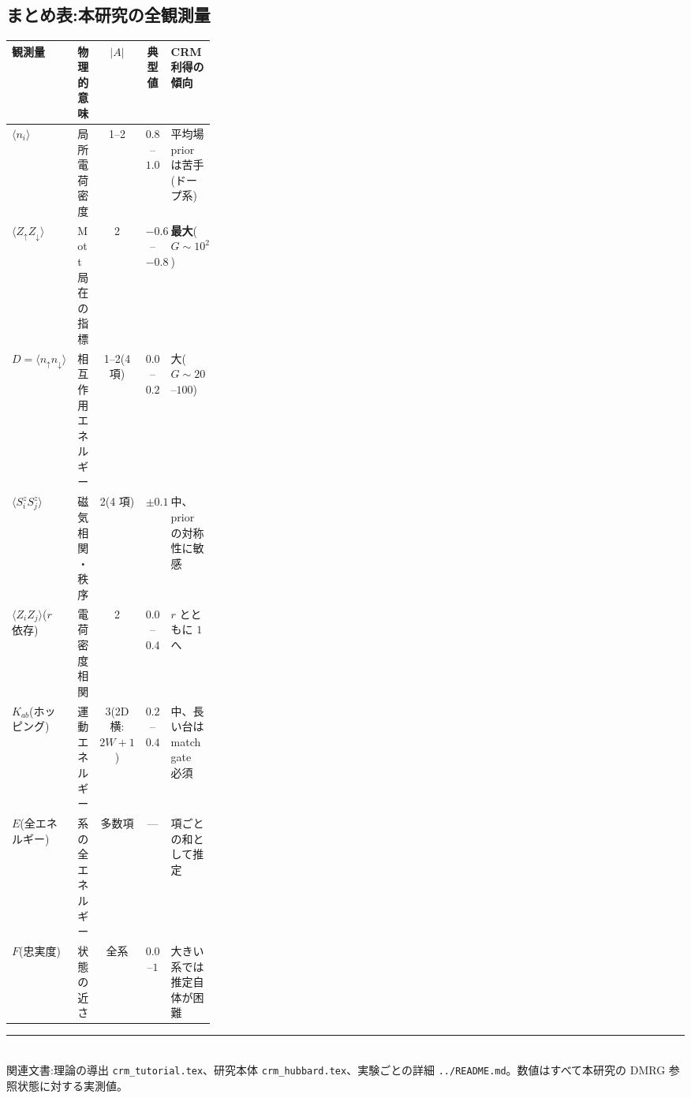\documentclass[11pt,a4paper]{ltjsarticle}
\newcommand{\ev}[1]{\langle #1\rangle}
\newcommand{\up}{\uparrow}
\newcommand{\dn}{\downarrow}
\begin{document}
\subsection{まとめ表:本研究の全観測量}
\begin{center}\small
\begin{tabular}{@{}llccp{0.30\linewidth}@{}}
\toprule
観測量 & 物理的意味 & $|A|$ & 典型値 & CRM 利得の傾向 \\
\midrule
$\ev{n_i}$ & 局所電荷密度 & 1--2 & $0.85$--$1.0$ & 平均場 prior は苦手(ドープ系) \\
$\ev{Z_\up Z_\dn}$ & Mott 局在の指標 & 2 & $-0.6$--$-0.8$ & \textbf{最大}($G\sim10^2$) \\
$D=\ev{n_\up n_\dn}$ & 相互作用エネルギー & 1--2(4 項) & $0.05$--$0.25$ & 大($G\sim20$--$100$) \\
$\ev{S^z_iS^z_j}$ & 磁気相関・秩序 & 2(4 項) & $\pm0.1$ & 中、prior の対称性に敏感 \\
$\ev{Z_iZ_j}$($r$ 依存) & 電荷密度相関 & 2 & $0.05$--$0.4$ & $r$ とともに $1$ へ \\
$K_{ab}$(ホッピング) & 運動エネルギー & 3(2D 横: $2W{+}1$) & $0.24$--$0.44$ & 中、長い台は matchgate 必須 \\
$E$(全エネルギー) & 系の全エネルギー & 多数項 & — & 項ごとの和として推定 \\
$F$(忠実度) & 状態の近さ & 全系 & $0.007$--$1$ & 大きい系では推定自体が困難 \\
\bottomrule
\end{tabular}
\end{center}

\vfill
\noindent\rule{\linewidth}{0.4pt}\\
\footnotesize 関連文書:理論の導出 \texttt{crm\_tutorial.tex}、研究本体 \texttt{crm\_hubbard.tex}、実験ごとの詳細 \texttt{../README.md}。数値はすべて本研究の DMRG 参照状態に対する実測値。
\end{document}
